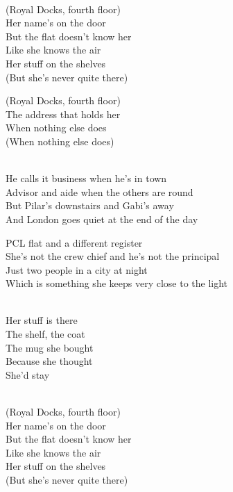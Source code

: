 \begin{lyrics}
\\
(Royal Docks, fourth floor)\\
Her name's on the door\\
But the flat doesn't know her\\
Like she knows the air\\
Her stuff on the shelves\\
(But she's never quite there)

(Royal Docks, fourth floor)\\
The address that holds her\\
When nothing else does\\
(When nothing else does)

\sepbar

\\
He calls it business when he's in town\\
Advisor and aide when the others are round\\
But Pilar's downstairs and Gabi's away\\
And London goes quiet at the end of the day

PCL flat and a different register\\
She's not the crew chief and he's not the principal\\
Just two people in a city at night\\
Which is something she keeps very close to the light

\\
Her stuff is there\\
The shelf, the coat\\
The mug she bought\\
Because she thought\\
She'd stay

\\
(Royal Docks, fourth floor)\\
Her name's on the door\\
But the flat doesn't know her\\
Like she knows the air\\
Her stuff on the shelves\\
(But she's never quite there)


\end{lyrics}
